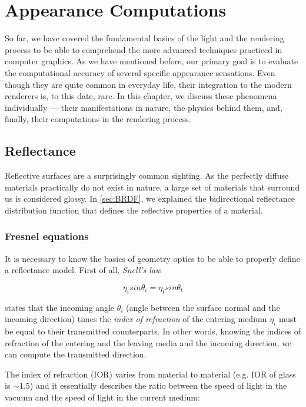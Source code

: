 \chapter{Appearance Computations}
\label{chap:appearance}

So far, we have covered the fundamental basics of the light and the rendering process to be able to comprehend the more advanced techniques practiced in computer graphics. As we have mentioned before, our primary goal is to evaluate the computational accuracy of several specific appearance sensations. Even though they are quite common in everyday life, their integration to the modern renderers is, to this date, rare. In this chapter, we discuss these phenomena individually --- their manifestations in nature, the physics behind them, and, finally, their computations in the rendering process. 

\section{Reflectance}

Reflective surfaces are a surprisingly common sighting. As the perfectly diffuse materials practically do not exist in nature, a large set of materials that surround us is considered glossy. In \autoref{sec:BRDF}, we explained the bidirectional reflectance distribution function that defines the reflective properties of a material. 

\subsection{Fresnel equations}

It is necessary to know the basics of geometry optics to be able to properly define a reflectance model. First of all, \emph{Snell's law}~\cite{pharr2016physically}

\begin{equation}
\eta_i sin\theta_i = \eta_t sin\theta_t 
\end{equation}

states that the incoming angle $\theta_i$ (angle between the surface normal and the incoming direction) times the \emph{index of refraction} of the entering medium $\eta_i$ must be equal to their transmitted counterparts. In other words, knowing the indices of refraction of the entering and the leaving media and the incoming direction, we can compute the transmitted direction.

The index of refraction (IOR) varies from material to material (e.g. IOR of glass is $\sim$1.5) and it essentially describes the ratio between the speed of light in the vacuum and the speed of light in the current medium: 

